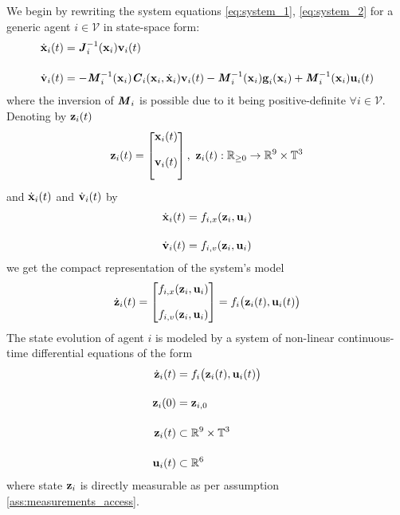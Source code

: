 We begin by rewriting the system equations \eqref{eq:system_1},
\eqref{eq:system_2} for a generic agent $i \in \mathcal{V}$ in state-space form:
\begin{subequations}
\begin{align}
  \dot{\bm{\mathbf{x}}}_i(t) &= \bm{\mathit{J}}_i^{-1}(\bm{\mathbf{x}}_i) \bm{\mathbf{v}}_i(t) \\[2.5ex]
  \dot{\bm{\mathbf{v}}}_i(t) &= -\bm{\mathit{M}}_i^{-1}(\bm{\mathbf{x}}_i)\bm{\mathit{C}}_i(\bm{\mathbf{x}}_i,\dot{\bm{\mathbf{x}}}_i) \bm{\mathbf{v}}_i(t)
    - \bm{\mathit{M}}_i^{-1}(\bm{\mathbf{x}}_i)\bm{\mathbf{g}}_i(\bm{\mathbf{x}}_i)
    + \bm{\mathit{M}}_i^{-1}(\bm{\mathbf{x}}_i)\bm{\mathbf{u}}_i(t)
\end{align}
\label{eq:state_space_system}
\end{subequations}
where the inversion of $\bm{\mathit{M}}_i$ is possible due to it being
positive-definite $\forall i \in \mathcal{V}$. Denoting by $\bm{\mathbf{z}}_i(t)$
\begin{align}
  \bm{\mathbf{z}}_i(t) =
    \begin{bmatrix}
      \bm{\mathbf{x}}_i(t) \\[2.5ex]
      \bm{\mathbf{v}}_i(t) \\[2.5ex]
    \end{bmatrix},\
    \bm{\mathbf{z}}_i(t) : \mathbb{R}_{\geq 0} \to \mathbb{R}^9 \times \mathbb{T}^3
\end{align}
and
$\dot{\bm{\mathbf{x}}}_i(t)$ and $\dot{\bm{\mathbf{v}}}_i(t)$ by
\begin{subequations}
\begin{align}
  \dot{\bm{\mathbf{x}}}_i(t) &= f_{i,x}(\bm{\mathbf{z}}_i, \bm{\mathbf{u}}_i) \\[2.5ex]
  \dot{\bm{\mathbf{v}}}_i(t) &= f_{i,v}(\bm{\mathbf{z}}_i, \bm{\mathbf{u}}_i)
\end{align}
\end{subequations}
we get the compact representation of the system's model
\begin{align}
  \dot{\bm{\mathbf{z}}}_i(t) =
    \begin{bmatrix}
      f_{i,x}(\bm{\mathbf{z}}_i, \bm{\mathbf{u}}_i) \\[2.5ex]
      f_{i,v}(\bm{\mathbf{z}}_i, \bm{\mathbf{u}}_i)
    \end{bmatrix} =
 f_i \big(\bm{\mathbf{z}}_i (t), \bm{\mathbf{u}}_i (t)\big)
\end{align}
The state evolution of agent $i$ is modeled by a system of non-linear
continuous-time differential equations of the form
\begin{align}
  \dot{\bm{\mathbf{z}}}_i(t) &= f_i \big(\bm{\mathbf{z}}_i (t), \bm{\mathbf{u}}_i (t)\big) \label{eq:non_perturbed_system}\\[2.5ex]
  \bm{\mathbf{z}}_i(0) &= \bm{\mathbf{z}}_{i,0} \\[2.5ex]
  \bm{\mathbf{z}}_i (t) & \subset \mathbb{R}^{9} \times \mathbb{T}^3 \\[2.5ex]
  \bm{\mathbf{u}}_i (t) & \subset \mathbb{R}^6
  \label{eq:original_z_system}
\end{align}
where state $\bm{\mathbf{z}}_i$ is directly measurable as per assumption
\eqref{ass:measurements_access}.

